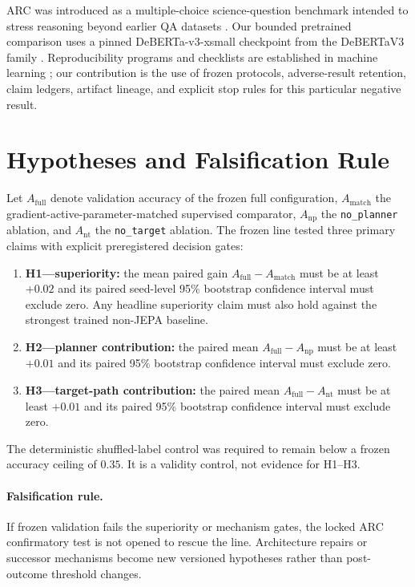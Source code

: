 \documentclass[11pt]{article}
\begin{document}
ARC was introduced as a multiple-choice science-question benchmark intended to stress reasoning beyond earlier QA datasets \citep{clark2018arc}. Our bounded pretrained comparison uses a pinned DeBERTa-v3-xsmall checkpoint from the DeBERTaV3 family \citep{he2023debertav3}. Reproducibility programs and checklists are established in machine learning \citep{pineau2021reproducibility}; our contribution is the use of frozen protocols, adverse-result retention, claim ledgers, artifact lineage, and explicit stop rules for this particular negative result.

\section{Hypotheses and Falsification Rule}
Let $A_{\mathrm{full}}$ denote validation accuracy of the frozen full configuration, $A_{\mathrm{match}}$ the gradient-active-parameter-matched supervised comparator, $A_{\mathrm{np}}$ the \texttt{no\_planner} ablation, and $A_{\mathrm{nt}}$ the \texttt{no\_target} ablation. The frozen line tested three primary claims with explicit preregistered decision gates:
\begin{enumerate}[leftmargin=*]
    \item \textbf{H1---superiority:} the mean paired gain $A_{\mathrm{full}}-A_{\mathrm{match}}$ must be at least $+0.02$ and its paired seed-level 95\% bootstrap confidence interval must exclude zero. Any headline superiority claim must also hold against the strongest trained non-JEPA baseline.
    \item \textbf{H2---planner contribution:} the paired mean $A_{\mathrm{full}}-A_{\mathrm{np}}$ must be at least $+0.01$ and its paired 95\% bootstrap confidence interval must exclude zero.
    \item \textbf{H3---target-path contribution:} the paired mean $A_{\mathrm{full}}-A_{\mathrm{nt}}$ must be at least $+0.01$ and its paired 95\% bootstrap confidence interval must exclude zero.
\end{enumerate}
The deterministic shuffled-label control was required to remain below a frozen accuracy ceiling of $0.35$. It is a validity control, not evidence for H1--H3.

\paragraph{Falsification rule.} If frozen validation fails the superiority or mechanism gates, the locked ARC confirmatory test is not opened to rescue the line. Architecture repairs or successor mechanisms become new versioned hypotheses rather than post-outcome threshold changes.
\end{document}
